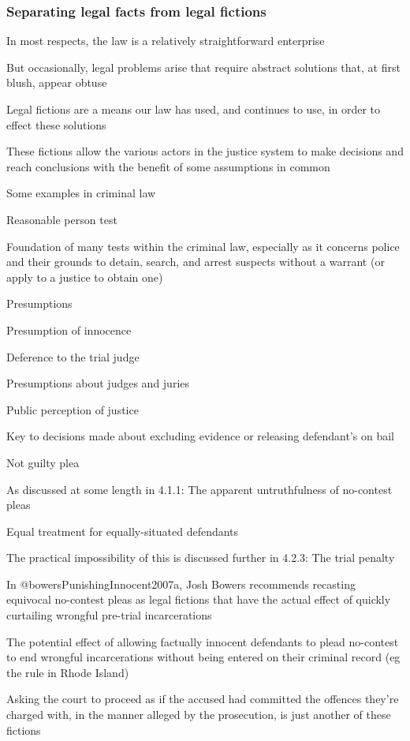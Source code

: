\subsubsection{Separating legal facts from legal fictions}

In most respects, the law is a relatively straightforward enterprise

But occasionally, legal problems arise that require abstract solutions that, at first blush, appear obtuse

Legal fictions are a means our law has used, and continues to use, in order to effect these solutions

These fictions allow the various actors in the justice system to make decisions and reach conclusions with the benefit of some assumptions in common

Some examples in criminal law

Reasonable person test

Foundation of many tests within the criminal law, especially as it concerns police and their grounds to detain, search, and arrest suspects without a warrant (or apply to a justice to obtain one)

Presumptions

Presumption of innocence

Deference to the trial judge

Presumptions about judges and juries

Public perception of justice

Key to decisions made about excluding evidence or releasing defendant's on bail

Not guilty plea

As discussed at some length in 4.1.1: The apparent untruthfulness of no-contest pleas

Equal treatment for equally-situated defendants

The practical impossibility of this is discussed further in 4.2.3: The trial penalty

In @bowersPunishingInnocent2007a, Josh Bowers recommends recasting equivocal no-contest pleas as legal fictions that have the actual effect of quickly curtailing wrongful pre-trial incarcerations

The potential effect of allowing factually innocent defendants to plead no-contest to end wrongful incarcerations without being entered on their criminal record (eg the rule in Rhode Island)

Asking the court to proceed as if the accused had committed the offences they're charged with, in the manner alleged by the prosecution, is just another of these fictions

